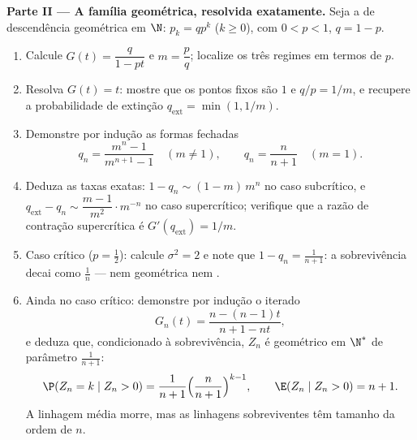 \begin{problem}
\medskip
\noindent\textbf{Parte II --- A família geométrica, resolvida
exatamente.} Seja a  de descendência geométrica em $\N$: $p_k =
qp^k$ ($k \geq 0$), com $0 < p < 1$, $q = 1 - p$.
\begin{enumerate}[resume]
  \item Calcule $G(t) = \dfrac{q}{1 - pt}$ e $m = \dfrac
        pq$; localize os três regimes em termos de $p$.
  \item Resolva $G(t) = t$: mostre que os pontos fixos são $1$ e
        $q/p = 1/m$, e recupere a probabilidade de extinção
        $q_{\mathrm{ext}} = \min(1, 1/m)$.
  \item Demonstre por indução as formas fechadas
        \[
        q_n = \frac{m^n - 1}{m^{n+1} - 1} \quad (m \neq 1),
        \qquad
        q_n = \frac{n}{n+1} \quad (m = 1).
        \]
  \item Deduza as taxas exatas: $1 - q_n \sim (1 - m)\,m^n$
        no caso subcrítico, e $q_{\mathrm{ext}} - q_n
        \sim \dfrac{m - 1}{m^{2}}\cdot m^{-n}$ no
        caso supercrítico; verifique que a razão de contração
        supercrítica é $G'(q_{\mathrm{ext}}) = 1/m$.
  \item Caso crítico ($p = \tfrac12$): calcule $\sigma^2 =
        2$ e note que $1 - q_n = \frac1{n+1}$: a sobrevivência decai
        como $\frac1n$ --- nem geométrica nem .
  \item Ainda no caso crítico: demonstre por indução o iterado 
        \[
        G_n(t) = \frac{n - (n-1)t}{n + 1 - nt},
        \]
        e deduza que, condicionado à sobrevivência, $Z_n$ é
        geométrico em $\N^*$ de parâmetro $\frac1{n+1}$:
        \[
        \P(Z_n = k \mid Z_n > 0) = \frac1{n+1}
        \Bigl(\frac{n}{n+1}\Bigr)^{k-1},
        \qquad
        \E(Z_n \mid Z_n > 0) = n + 1 .
        \]
        A linhagem média morre, mas as linhagens sobreviventes têm
        tamanho da ordem de $n$.
\end{enumerate}


\end{problem}
